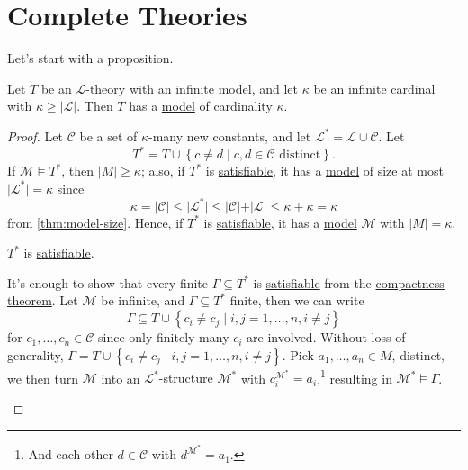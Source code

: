 \section{Complete Theories}
Let's start with a proposition.

\begin{proposition}\label{prop:lec10}
	Let \(T\) be an \hyperref[def:theory]{\(\mathcal{L}\)-theory} with an infinite \hyperref[def:model]{model}, and let \(\kappa \) be an infinite cardinal with \(\kappa \geq \vert \mathcal{L}  \vert \). Then \(T\) has a \hyperref[def:model]{model} of cardinality \(\kappa \).
\end{proposition}
\begin{proof}
	Let \(\mathcal{C} \) be a set of \(\kappa \)-many new constants, and let \(\mathcal{L} ^{\ast} = \mathcal{L} \cup \mathcal{C} \). Let
	\[
		T^{\ast} = T \cup \left\{ c \neq d \mid c, d\in \mathcal{C} \text{ distinct}  \right\} .
	\]
	If \(\mathcal{M} \models T^{\ast} \), then \(\vert M \vert \geq \kappa \); also, if \(T^{\ast} \) is \hyperref[def:satisfiable]{satisfiable}, it has a \hyperref[def:model]{model} of size at most \(\vert \mathcal{L} ^{\ast} \vert = \kappa \) since
	\[
		\kappa = \vert \mathcal{C} \vert \leq \vert \mathcal{L} ^{\ast} \vert \leq \vert \mathcal{C} \vert + \vert \mathcal{L} \vert \leq \kappa + \kappa = \kappa
	\]
	from \autoref{thm:model-size}. Hence, if \(T^{\ast} \) is \hyperref[def:satisfiable]{satisfiable}, it has a \hyperref[def:model]{model} \(\mathcal{M} \) with \(\vert M \vert = \kappa \).

	\begin{claim}
		\(T^{\ast} \) is \hyperref[def:satisfiable]{satisfiable}.
	\end{claim}
	\begin{explanation}
		It's enough to show that every finite \(\Gamma \subseteq T^{\ast} \) is \hyperref[def:satisfiable]{satisfiable} from the \hyperref[thm:compactness]{compactness theorem}. Let \(\mathcal{M} \) be infinite, and \(\Gamma \subseteq T^{\ast} \) finite, then we can write
		\[
			\Gamma \subseteq T \cup \left\{ c_i \neq c_j \mid i, j = 1, \ldots , n, i \neq j \right\}
		\]
		for \(c_1, \ldots , c_n\in \mathcal{C} \) since only finitely many \(c_i\) are involved. Without loss of generality, \(\Gamma = T \cup \left\{ c_i \neq c_j \mid i, j=1, \ldots , n, i \neq j \right\} \). Pick \(a_1, \ldots , a_n\in M\), distinct, we then turn \(\mathcal{M} \) into an \hyperref[def:structure]{\(\mathcal{L} ^{\ast} \)-structure} \(\mathcal{M} ^{\ast} \) with \(c_i ^{\mathcal{M} ^{\ast} } = a_i\),\footnote{And each other \(d\in \mathcal{C} \) with \(d^{\mathcal{M} ^{\ast} } = a_1\).} resulting in \(\mathcal{M} ^{\ast} \models \Gamma \).
	\end{explanation}
\end{proof}